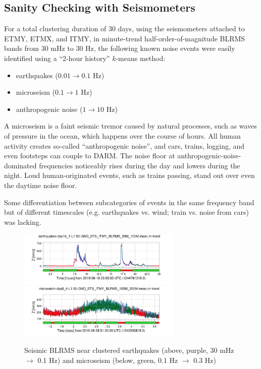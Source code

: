 \documentclass[colorlinks=true,pdfstartview=FitV,linkcolor=blue,
            citecolor=red,urlcolor=magenta]{ligodoc}
\begin{document}
\subsection{Sanity Checking with Seismometers}
For a total clustering duration of 30 days, using the seismometers attached to ETMY, ETMX, and ITMY, in minute-trend half-order-of-magnitude BLRMS bands from 30 mHz to 30 Hz, the following known noise events were easily identified using a ``2-hour history'' $k$-means method:
\begin{itemize}
\item earthquakes ($0.01\to0.1$ Hz)
\item microseism ($0.1\to1$ Hz)
\item anthropogenic noise ($1\to10$ Hz)
\end{itemize}

A microseism is a faint seismic tremor caused by natural processes, such as waves of pressure in the ocean, which happens over the course of hours. All human activity creates so-called ``anthropogenic noise'', and cars, trains, logging, and even footsteps can couple to DARM. The noise floor at anthropogenic-noise-dominated frequencies noticeably rises during the day and lowers during the night. Loud human-originated events, such as trains passing, stand out over even the daytime noise floor.

Some differentiation between subcategories of events in the same frequency band but of different timescales (e.g. earthquakes vs. wind; train vs. noise from cars) was lacking.

\begin{figure}[h]\hspace{-2ex}
  \includegraphics[width=0.7\textwidth]{assets/final/earthquakes-day16_1-L1:ISI-GND_STS_ITMY_BLRMS_30M_100Mmean,m-trend.png}
  \includegraphics[width=0.7\textwidth]{assets/final/microseism-day8_4-L1:ISI-GND_STS_ITMY_BLRMS_100M_300Mmean,m-trend.png}
  \caption{Seismic BLRMS near clustered earthquakes (above, purple, 30 mHz $\to$ 0.1 Hz) and microseism (below, green, 0.1 Hz $\to$ 0.3 Hz)}
\end{figure}
\end{document}
